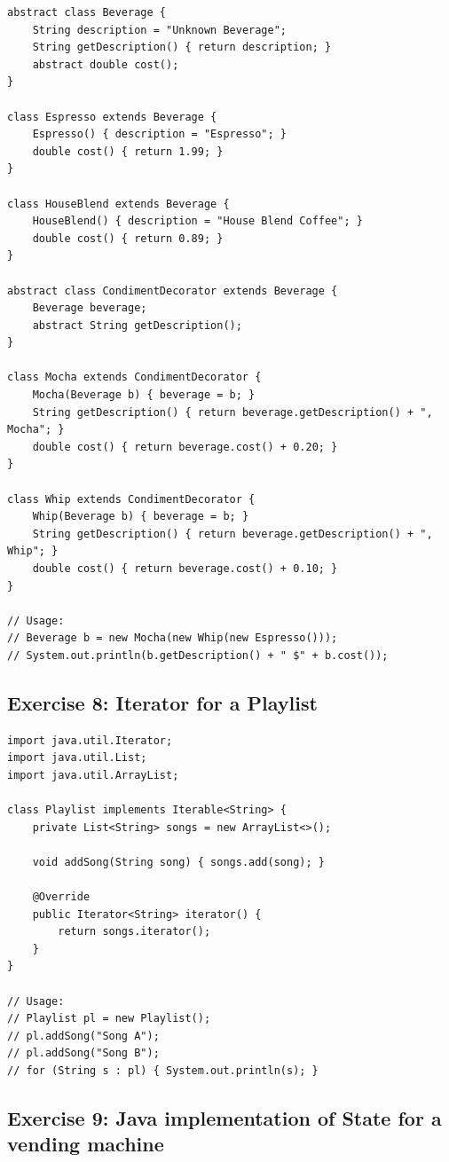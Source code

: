 \documentclass[twoside=false,DIV=14]{scrartcl}
\begin{document}
\begin{lstlisting}
abstract class Beverage {
    String description = "Unknown Beverage";
    String getDescription() { return description; }
    abstract double cost();
}

class Espresso extends Beverage {
    Espresso() { description = "Espresso"; }
    double cost() { return 1.99; }
}

class HouseBlend extends Beverage {
    HouseBlend() { description = "House Blend Coffee"; }
    double cost() { return 0.89; }
}

abstract class CondimentDecorator extends Beverage {
    Beverage beverage;
    abstract String getDescription();
}

class Mocha extends CondimentDecorator {
    Mocha(Beverage b) { beverage = b; }
    String getDescription() { return beverage.getDescription() + ", Mocha"; }
    double cost() { return beverage.cost() + 0.20; }
}

class Whip extends CondimentDecorator {
    Whip(Beverage b) { beverage = b; }
    String getDescription() { return beverage.getDescription() + ", Whip"; }
    double cost() { return beverage.cost() + 0.10; }
}

// Usage:
// Beverage b = new Mocha(new Whip(new Espresso()));
// System.out.println(b.getDescription() + " $" + b.cost());
\end{lstlisting}

\subsection*{Exercise 8: Iterator for a Playlist}

\begin{lstlisting}
import java.util.Iterator;
import java.util.List;
import java.util.ArrayList;

class Playlist implements Iterable<String> {
    private List<String> songs = new ArrayList<>();

    void addSong(String song) { songs.add(song); }

    @Override
    public Iterator<String> iterator() {
        return songs.iterator();
    }
}

// Usage:
// Playlist pl = new Playlist();
// pl.addSong("Song A");
// pl.addSong("Song B");
// for (String s : pl) { System.out.println(s); }
\end{lstlisting}

\subsection*{Exercise 9: Java implementation of State for a vending machine}
\end{document}
